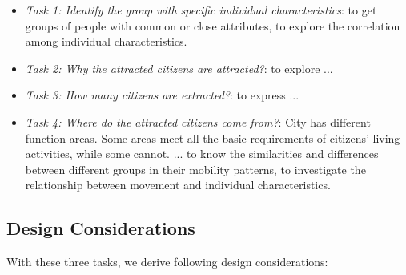 
\begin{itemize}
\item \textit{Task 1: Identify the group with specific individual characteristics}: to get groups of people with common or close attributes, to explore the correlation among individual characteristics.
\item \textit{Task 2: Why the attracted citizens are attracted?}: to explore ...
\item \textit{Task 3: How many citizens are extracted?}: to express ...
\item \textit{Task 4: Where do the attracted citizens come from?}: City has different function areas. Some areas meet all the basic requirements of citizens' living activities, while some cannot. ... to know the similarities and differences between different groups in their mobility patterns, to investigate the relationship between movement and individual characteristics.
\end{itemize}

\subsection{Design Considerations}

With these three tasks, we derive following design considerations:

